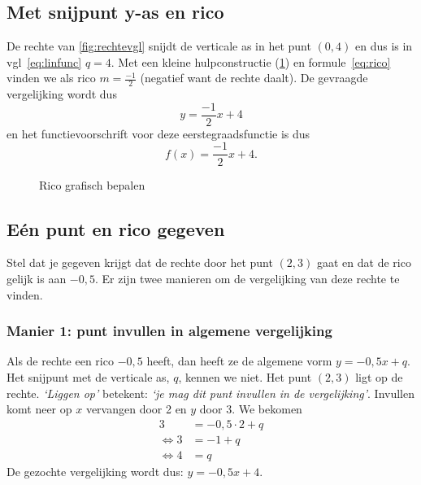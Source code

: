 \subsection{Met snijpunt y-as en rico}
De rechte van \cref{fig:rechtevgl} snijdt de verticale as in het punt $(0,4)$ en dus is in vgl~\eqref{eq:linfunc} $q=4$. Met een kleine hulpconstructie (\cref{fig:rechtevgl2}) en formule~\eqref{eq:rico} vinden we als rico $m=\frac{-1}{2}$ (negatief want de rechte daalt). De gevraagde vergelijking wordt dus
\[
y=\frac{-1}{2}x+4
\]
en het functievoorschrift voor deze eerstegraadsfunctie is dus
\[
f(x)=\frac{-1}{2}x+4.
\]
\begin{figure}[htbp]
    \centering
{}
\caption{Rico grafisch bepalen}
    \label{fig:rechtevgl2}
\end{figure}

\subsection{Eén punt en rico gegeven}
Stel dat je gegeven krijgt dat de rechte door het punt $(2,3)$ gaat en dat de rico gelijk is aan $-0,5$. Er zijn twee manieren om de vergelijking van deze rechte te vinden.

\subsubsection{Manier 1: punt invullen in algemene vergelijking}
Als de rechte een rico $-0,5$ heeft, dan heeft ze de algemene vorm $y=-0,5x+q$. Het snijpunt met de verticale as, $q$, kennen we niet. Het punt $(2,3)$ ligt op de rechte. \emph{`Liggen op'} betekent: \emph{`je mag dit punt invullen in de vergelijking'}. Invullen komt neer op $x$ vervangen door 2 en $y$ door 3. We bekomen 
\begin{align*}
3&=-0,5\cdot 2 + q\\
\Leftrightarrow 3&=-1+q\\
\Leftrightarrow 4&=q
\end{align*}
De gezochte vergelijking wordt dus: $y=-0,5x+4$.

